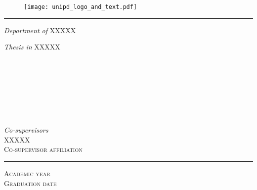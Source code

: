 \begin{titlepage}
  \makeatletter
  \begin{figure}
  \centering
  \texttt{[image: unipd\_logo\_and\_text.pdf]}
  \end{figure}
  \begin{center}
  \vspace*{-1cm}
    \noindent\rule{\textwidth}{0.5pt}
    \begin{large}
      \textit{Department of } \textsc{XXXXX}\\[0.1cm]
    \end{large}
    \begin{normalsize}
      \textit{Thesis in } \textsc{XXXXX}\\[1.2cm]
    \end{normalsize}
  	
  	\begin{LARGE}
  	\@title\\
  	\end{LARGE}
  	
    
    \vspace*{1cm}
    \begin{normalsize}
      \noindent
		\makebox[\textwidth][c]{ }%
		\\[0.1cm]
	\end{normalsize} 
    \begin{large}
	  \noindent
		\makebox[0pt][l]{\@author}%
		\makebox[\textwidth][c]{ }%
		\\[0.05cm]
    \end{large}
    \begin{normalsize}
	  \noindent
		\makebox[0pt][l]{}%
		\makebox[\textwidth][c]{ }%
		\\[-0.1cm]
    \end{normalsize}
	\begin{center}
	\textit{Co-supervisors}\\[0.2cm]
	\textsc{\large{XXXXX}}\\[0.05cm]
	\textsc{Co-supervisor affiliation}\\[0.25cm]
	\end{center}

    \vfill
    \noindent\rule{\textwidth}{0.5pt}
    \begin{normalsize}
    \textsc{Academic year}\\
    \textsc{Graduation date}\\
    \end{normalsize}
  \end{center}
  \makeatother
\end{titlepage}

